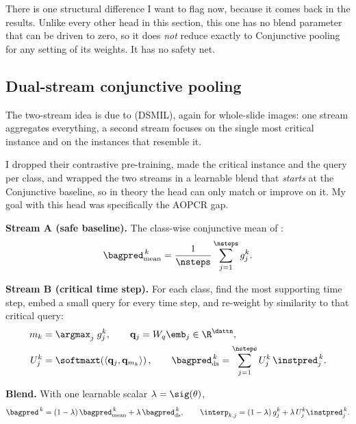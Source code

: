 There is one structural difference I want to flag now, because it comes back in the results. Unlike
every other head in this section, this one has no blend parameter that can be driven to zero, so it
does \emph{not} reduce exactly to Conjunctive pooling for any setting of its weights. It has no
safety net.

\subsection{Dual-stream conjunctive pooling}
\label{sec:pool:dsmil}

\begin{priorwork}
The two-stream idea is due to \citet{li2021dsmil} (DSMIL), again for whole-slide images: one stream
aggregates everything, a second stream focuses on the single most critical instance and on the
instances that resemble it.
\end{priorwork}

\begin{contribution}
I dropped their contrastive pre-training, made the critical instance and the query per class, and
wrapped the two streams in a learnable blend that \emph{starts} at the Conjunctive baseline, so in
theory the head can only match or improve on it. My goal with this head was specifically the AOPCR
gap.
\end{contribution}

\textbf{Stream A (safe baseline).} The class-wise conjunctive mean of :
\begin{equation}
  \bagpred^{\,k}_{\text{mean}} = \frac{1}{\nsteps}\sum_{j=1}^{\nsteps} g_j^k .
  \label{eq:ds_streamA}
\end{equation}

\textbf{Stream B (critical time step).} For each class, find the most supporting time step, embed a
small query for every time step, and re-weight by similarity to that critical query:
\begin{align}
  m_k &= \argmax_{j} \; g_j^k ,
  \qquad
  \mathbf{q}_j = W_q \emb_j \in \R^{\dattn},
  \label{eq:ds_query}\\
  U_j^k &= \softmaxt\!\left(\langle \mathbf{q}_j, \mathbf{q}_{m_k}\rangle\right),
  \qquad
  \bagpred^{\,k}_{\text{ds}} = \sum_{j=1}^{\nsteps} U_j^k \, \instpred_j^{\,k}.
  \label{eq:ds_streamB}
\end{align}

\textbf{Blend.} With one learnable scalar $\lambda = \sig(\theta)$,
\begin{equation}
  \bagpred^{\,k} = (1-\lambda)\,\bagpred^{\,k}_{\text{mean}}
                 + \lambda\,\bagpred^{\,k}_{\text{ds}},
  \qquad
  \interp_{k,j} = (1-\lambda)\, g_j^k + \lambda\, U_j^k \instpred_j^{\,k}.
  \label{eq:ds_blend}
\end{equation}

